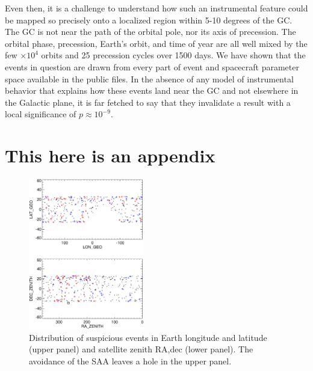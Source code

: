 \documentclass[aps,twocolumn,prd,superscriptaddress,showpacs,nofootinbib,fixfloat]{revtex4}
\begin{document}
Even then, it is a challenge to understand how such an
instrumental feature could be mapped so precisely onto a
localized region within 5-10 degrees of the GC.  The GC is
not near the path of the orbital pole, nor its axis of
precession.  The orbital phase, precession, Earth's orbit,
and time of year are all well mixed by the few $\times10^4$
orbits and 25 precession cycles over 1500 days.  We have
shown that the events in question are drawn from every part
of event and spacecraft parameter space available in the
public files.  In the absence of any model of instrumental
behavior that explains how these events land near the GC and
not elsewhere in the Galactic plane, it is far fetched to
say that they invalidate a result with a local significance
of $p\approx10^{-9}$.


\appendix
\section{This here is an appendix}


\begin{figure}
  \centering
  \includegraphics[width=0.45\textwidth]{plots/geo-lonlat.ps}
  \caption{Distribution of suspicious events in Earth
  longitude and latitude (upper panel) and satellite zenith
  RA,dec (lower panel).   The avoidance of the SAA leaves a
  hole in the upper panel.}
  \label{fig:geo-lonlat}
\end{figure}
\end{document}

